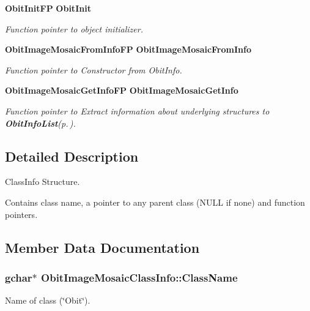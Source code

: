\begin{CompactItemize}
{\bf Obit\-Init\-FP} {\bf Obit\-Init}
\begin{CompactList}\small\item\em Function pointer to object initializer. \item\end{CompactList}\item 
{\bf Obit\-Image\-Mosaic\-From\-Info\-FP} {\bf Obit\-Image\-Mosaic\-From\-Info}
\begin{CompactList}\small\item\em Function pointer to Constructor from Obit\-Info. \item\end{CompactList}\item 
{\bf Obit\-Image\-Mosaic\-Get\-Info\-FP} {\bf Obit\-Image\-Mosaic\-Get\-Info}
\begin{CompactList}\small\item\em Function pointer to Extract information about underlying structures to {\bf Obit\-Info\-List}{\rm (p.\,\pageref{structObitInfoList})}. \item\end{CompactList}\end{CompactItemize}


\subsection{Detailed Description}
Class\-Info Structure. 

Contains class name, a pointer to any parent class (NULL if none) and function pointers. 



\subsection{Member Data Documentation}
\subsubsection{\setlength{\rightskip}{0pt plus 5cm}gchar$\ast$ {\bf Obit\-Image\-Mosaic\-Class\-Info::Class\-Name}}\label{structObitImageMosaicClassInfo_o2}


Name of class (\char`\"{}Obit\char`\"{}). 


